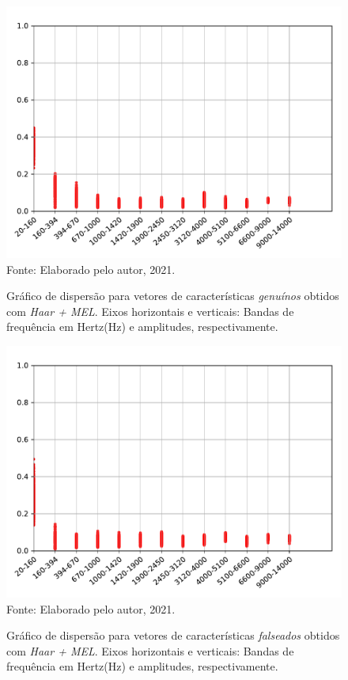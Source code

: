\begin{figure}[H]
	\centering
	\caption{Gráfico de dispersão para vetores de características \textit{genuínos} obtidos com \textit{Haar + MEL}. Eixos horizontais e verticais: Bandas de frequência em Hertz(Hz) e amplitudes, respectivamente.}
	\includegraphics[scale=.8]{./images/results/barkVersusMel/Genuine_haar_Mel.pdf}
	\label{fig:livehaarmel}
	\\Fonte: Elaborado pelo autor, 2021.
\end{figure}
\begin{figure}[H]
	\centering
	\caption{Gráfico de dispersão para vetores de características \textit{falseados} obtidos com \textit{Haar + MEL}. Eixos horizontais e verticais: Bandas de frequência em Hertz(Hz) e amplitudes, respectivamente.}
	\includegraphics[scale=.8]{./images/results/barkVersusMel/Spoofing_haar_Mel.pdf}
	\label{fig:spoofinghaarmel}
	\\Fonte: Elaborado pelo autor, 2021.
\end{figure}
